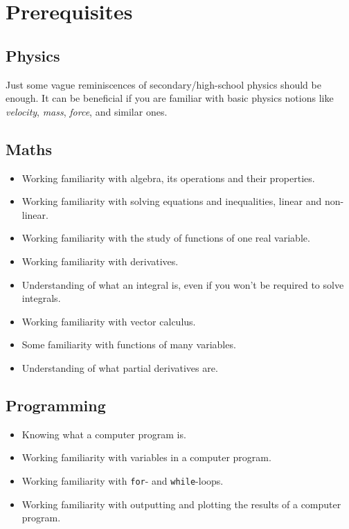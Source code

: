 \documentclass[a4paper,12pt,%
onecolumn,oneside,%
british%
]{memoir}
\renewcommand*{\|}[1][]{\nonscript\:#1\vert\nonscript\:\mathopen{}}
\begin{document}
\section{Prerequisites}
\label{sec:guide_physics}

\subsection{Physics}

Just some vague reminiscences of secondary/high-school physics should be enough. It can be beneficial if you are familiar with basic physics notions like \emph{velocity}, \emph{mass}, \emph{force}, and similar ones.

\subsection{Maths}

\begin{itemize}
\item Working familiarity with algebra, its operations and their properties.
\item Working familiarity with solving equations and inequalities, linear and non-linear.
\item Working familiarity with the study of functions of one real variable.
\item Working familiarity with derivatives.
\item Understanding of what an integral is, even if you won't be required to solve integrals.
\item Working familiarity with vector calculus.
\item Some familiarity with functions of many variables.
\item Understanding of what partial derivatives are.
\end{itemize}


\subsection{Programming}

\begin{itemize}
\item Knowing what a computer program is.
\item Working familiarity with variables in a computer program.
\item Working familiarity with \texttt{for}- and \texttt{while}-loops.
\item Working familiarity with outputting and plotting the results of a computer program.
\end{itemize}
\end{document}

